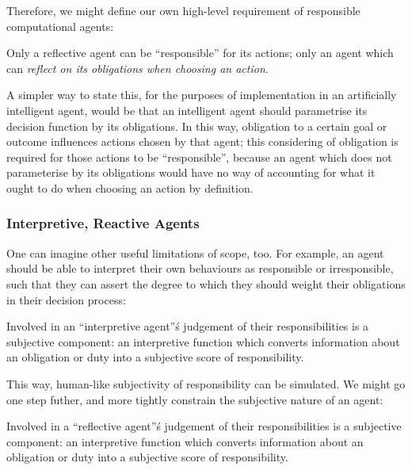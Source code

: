 Therefore, we might define our own high-level requirement of responsible computational agents:

\begin{displayquote}
    Only a reflective agent can be ``responsible'' for its actions; only an agent which can \emph{reflect on its obligations when choosing an action}.
\end{displayquote}\par

A simpler way to state this, for the purposes of implementation in an artificially intelligent agent, would be that an intelligent agent should parametrise its decision function by its obligations. In this way, obligation to a certain goal or outcome influences actions chosen by that agent; this considering of obligation is required for those actions to be ``responsible'', because an agent which does not parameterise by its obligations would have no way of accounting for what it ought to do when choosing an action by definition.\par

\subsubsection{Interpretive, Reactive Agents}
One can imagine other useful limitations of scope, too. For example, an agent should be able to interpret their own behaviours as responsible or irresponsible, such that they can assert the degree to which they should weight their obligations in their decision process:\par

\begin{displayquote}
    Involved in an ``interpretive agent''\'s judgement of their responsibilities is a subjective component: an interpretive function which converts information about an obligation or duty into a subjective score of responsibility.
\end{displayquote}\par

This way, human-like subjectivity of responsibility can be simulated. We might go one step futher, and more tightly constrain the subjective nature of an agent:\par

\begin{displayquote}
    Involved in a ``reflective agent''\'s judgement of their responsibilities is a subjective component: an interpretive function which converts information about an obligation or duty into a subjective score of responsibility.
\end{displayquote}\par


